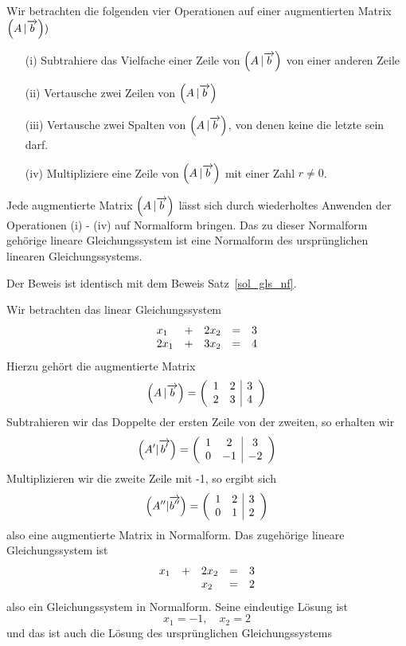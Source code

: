 \begin{satz}\label{gls_mat_operation}
Wir betrachten die folgenden vier Operationen auf einer augmentierten Matrix 
$\left(A \, \vert \overrightarrow{b}\right))$

\begin{itemize}
\item[(i)] Subtrahiere das Vielfache einer Zeile von $\left(A \, \vert \overrightarrow{b}\right)$ 
von einer anderen Zeile 
\item[(ii)] Vertausche zwei Zeilen von $\left(A \, \vert \overrightarrow{b}\right)$ 
\item[(iii)] Vertausche zwei Spalten von $\left(A \, \vert \overrightarrow{b}\right)$, von denen keine 
die letzte sein darf.
\item[(iv)] Multipliziere eine Zeile von $\left(A \, \vert \overrightarrow{b}\right)$ mit einer Zahl 
$r \neq 0$.
\end{itemize}

Jede augmentierte Matrix $\left(A \, \vert \overrightarrow{b}\right)$ lässt sich durch wiederholtes 
Anwenden der Operationen (i) - (iv) auf Normalform bringen. Das zu dieser Normalform gehörige 
lineare Gleichungssystem ist eine Normalform des ursprünglichen linearen Gleichungssystems.
\end{satz}

\beweis Der Beweis ist identisch mit dem Beweis Satz~\ref{sol_gls_nf}.

\begin{beispiel}\label{gls_normal_augmentiert_1} Wir betrachten das linear Gleichungssystem
  	$$ \begin{array} {l c l c l}
   	x_1 & + & 2 x_2 & = & 3 \\
   	2 x_1 & + & 3 x_2 & = & 4
   	\end{array} $$
Hierzu gehört die augmentierte Matrix
  	$$ \left(A \, \vert \overrightarrow{b}\right) = 
	\left( \begin{array} {c c | c}
	1 & 2 & 3 \\ 2 & 3 & 4 
     	\end{array} \right) $$
Subtrahieren wir das Doppelte der ersten Zeile von der zweiten, so erhalten wir 
  	$$  \left(A' \vert \overrightarrow{b'}\right) = 
	\left( \begin{array} {c c | c} 1 & 2 & 3 \\ 0 & -1 & -2 
   	\end{array} \right) $$ 
Multiplizieren wir die zweite Zeile mit -1, so ergibt sich 
  	$$  \left(A^{\prime \prime} \vert \overrightarrow{b^{\prime \prime}}\right) = 
   	\left( \begin{array} {c c | c} 1 & 2  & 3 \\ 0 & 1 & 2 
     	\end{array} \right) $$ 
also eine augmentierte Matrix in Normalform. Das zugehörige lineare Gleichungssystem ist
  	$$ \begin{array} {l c l c l}
   	x_1 & + & 2 x_2 & = & 3 \\
     	&   &  x_2 & = & 2
   	\end{array} $$
also ein Gleichungssystem in Normalform. Seine eindeutige Lösung ist
  	$$ x_1 = -1, \quad x_2 = 2 $$
und das ist auch die Lösung des ursprünglichen Gleichungssystems
\end{beispiel}

